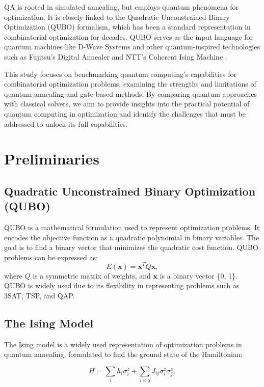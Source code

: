 \documentclass[conference]{IEEEtran}
\begin{document}
QA is rooted in simulated annealing, but employs quantum phenomena for optimization. It is closely linked to the Quadratic Unconstrained Binary Optimization (QUBO) formalism, which has been a standard representation in combinatorial optimization for decades. 
QUBO serves as the input language for quantum machines like D-Wave Systems and other quantum-inspired technologies such as Fujitsu’s Digital Annealer and NTT's Coherent Ising Machine \cite{9860117}.

This study focuses on benchmarking quantum computing's capabilities for combinatorial optimization problems, examining the strengths and limitations of quantum annealing and gate-based methods. 
By comparing quantum approaches with classical solvers, we aim to provide insights into the practical potential of quantum computing in optimization and identify the challenges that must be addressed to unlock its full capabilities.
\section{Preliminaries}
\subsection{Quadratic Unconstrained Binary Optimization (QUBO)}
QUBO is a mathematical formulation used to represent optimization problems. 
It encodes the objective function as a quadratic polynomial in binary variables. 
The goal is to find a binary vector that minimizes the quadratic cost function\cite{glover2019tutorialformulatingusingqubo}. 
QUBO problems can be expressed as:
\begin{equation}
E(\mathbf{x}) = \mathbf{x}^T Q \mathbf{x},
\end{equation}
where $Q$ is a symmetric matrix of weights, and $\mathbf{x}$ is a binary vector \{0, 1\}. 
QUBO is widely used due to its flexibility in representing problems such as 3SAT, TSP, and QAP.

\subsection{The Ising Model}
The Ising model is a widely used representation of optimization problems in quantum annealing, formulated to find the ground state of the Hamiltonian:

\begin{equation}
H = \sum_i h_i \sigma_i^z + \sum_{i < j} J_{ij} \sigma_i^z \sigma_j^z,
\end{equation}
\end{document}
